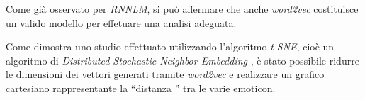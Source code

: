 \documentclass[a4paper,12pt,openright,twoside]{report}
\theoremstyle{definition}
\begin{document}
Come già osservato per \emph{RNNLM},
si può affermare che anche \emph{word2vec} costituisce un valido modello
per effetuare una analisi adeguata.

%

Come dimostra uno studio effettuato utilizzando l'algoritmo
\emph{t-SNE}, cioè un algoritmo di \emph{Distributed Stochastic Neighbor Embedding }, è stato possibile
ridurre le dimensioni dei vettori generati tramite \emph{word2vec} e realizzare un grafico cartesiano rappresentante la ``distanza ''
tra le varie emoticon.
\end{document}
